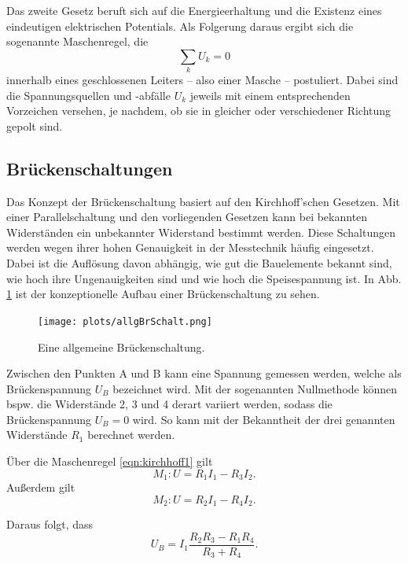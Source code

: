Das zweite Gesetz beruft sich auf die Energieerhaltung und die Existenz eines eindeutigen elektrischen Potentials. 
Als Folgerung daraus ergibt sich die sogenannte Maschenregel, die 
\begin{equation}
    \sum_k U_k=0
    \label{eqn:kirchhoff2}
\end{equation}
innerhalb eines geschlossenen Leiters -- also einer Masche -- postuliert. 
Dabei sind die Spannungsquellen und -abfälle $U_k$ jeweils mit einem entsprechenden Vorzeichen versehen, je nachdem, ob sie 
in gleicher oder verschiedener Richtung gepolt sind. 

\subsection{Brückenschaltungen} 
Das Konzept der Brückenschaltung basiert auf den Kirchhoff'schen Gesetzen.
Mit einer Parallelschaltung und den vorliegenden Gesetzen kann bei bekannten Widerständen ein unbekannter Widerstand bestimmt werden.
Diese Schaltungen werden wegen ihrer hohen Genauigkeit in der Messtechnik häufig eingesetzt.
Dabei ist die Auflösung davon abhängig, wie gut die Bauelemente bekannt sind, wie hoch ihre Ungenauigkeiten sind und wie hoch die Speisespannung ist.
In Abb. \ref{fig:allg_schalt} ist der konzeptionelle Aufbau einer Brückenschaltung zu sehen.

\begin{figure}
    \centering
    \texttt{[image: plots/allgBrSchalt.png]} %
    \caption{Eine allgemeine Brückenschaltung.}
    \label{fig:allg_schalt}
\end{figure}

Zwischen den Punkten A und B kann eine Spannung gemessen werden, welche als Brückenspannung $U_B$ bezeichnet wird.
Mit der sogenannten Nullmethode können bspw. die Widerstände 2, 3 und 4 derart variiert werden, sodass die Brückenspannung $U_B = 0$ wird.
So kann mit der Bekanntheit der drei genannten Widerstände $R_1$ berechnet werden.

Über die Maschenregel \ref{eqn:kirchhoff1} gilt
\begin{equation*}
    M_1: U = R_1I_1 - R_3I_2.
\end{equation*}
Außerdem gilt
\begin{equation*}
    M_2: U = R_2I_1 - R_4I_2.
\end{equation*}

Daraus folgt, dass
\begin{equation*}
    U_B = I_1\frac{R_2R_3 - R_1R_4}{R_3 + R_4}.
\end{equation*}

